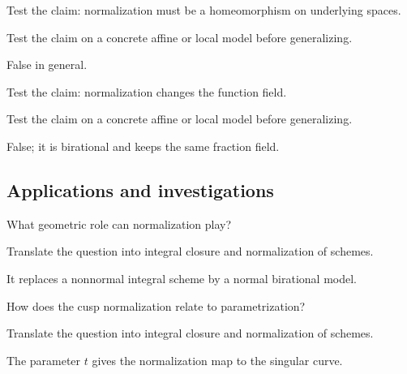 \begin{exercise}\label{exr:vi28-expand-11}
Test the claim: normalization must be a homeomorphism on underlying spaces.
\end{exercise}
\begin{hint}
Test the claim on a concrete affine or local model before generalizing.
\end{hint}
\begin{solution}
False in general.
\end{solution}

\begin{exercise}\label{exr:vi28-expand-12}
Test the claim: normalization changes the function field.
\end{exercise}
\begin{hint}
Test the claim on a concrete affine or local model before generalizing.
\end{hint}
\begin{solution}
False; it is birational and keeps the same fraction field.
\end{solution}

\subsection*{Applications and investigations}

\begin{exercise}\label{exr:vi28-expand-13}
What geometric role can normalization play?
\end{exercise}
\begin{hint}
Translate the question into integral closure and normalization of schemes.
\end{hint}
\begin{solution}
It replaces a nonnormal integral scheme by a normal birational model.
\end{solution}

\begin{exercise}\label{exr:vi28-expand-14}
How does the cusp normalization relate to parametrization?
\end{exercise}
\begin{hint}
Translate the question into integral closure and normalization of schemes.
\end{hint}
\begin{solution}
The parameter $t$ gives the normalization map to the singular curve.
\end{solution}

